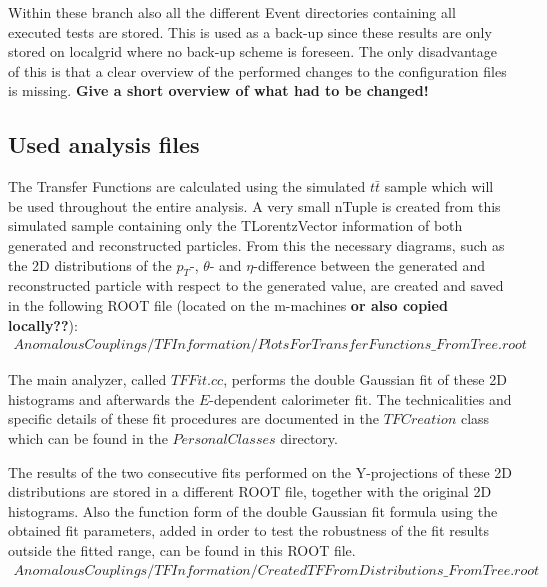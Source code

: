 Within these branch also all the different Event directories containing all executed tests are stored. This is used as a back-up since these results are only stored on localgrid where no back-up scheme is foreseen. The only disadvantage of this is that a clear overview of the performed changes to the configuration files is missing. \textbf{Give a short overview of what had to be changed!}

\subsection{Used analysis files}
The Transfer Functions are calculated using the simulated $t\bar{t}$ sample which will be used throughout the entire analysis. A very small nTuple is created from this simulated sample containing only the TLorentzVector information of both generated and reconstructed particles. From this the necessary diagrams, such as the 2D distributions of the $p_T$-, $\theta$- and $\eta$-difference between the generated and reconstructed particle with respect to the generated value, are created and saved in the following ROOT file (located on the m-machines \textbf{or also copied locally??}):
\begin{eqnarray*}
 AnomalousCouplings/TFInformation/PlotsForTransferFunctions\_FromTree.root 
\end{eqnarray*}

The main analyzer, called $TFFit.cc$, performs the double Gaussian fit of these 2D histograms and afterwards the $E$-dependent calorimeter fit. The technicalities and specific details of these fit procedures are documented in the $TFCreation$ class which can be found in the $PersonalClasses$ directory.

The results of the two consecutive fits performed on the Y-projections of these 2D distributions are stored in a different ROOT file, together with the original 2D histograms. Also the function form of the double Gaussian fit formula using the obtained fit parameters, added in order to test the robustness of the fit results outside the fitted range, can be found in this ROOT file.
\begin{eqnarray*}
 AnomalousCouplings/TFInformation/CreatedTFFromDistributions\_FromTree.root
\end{eqnarray*}

